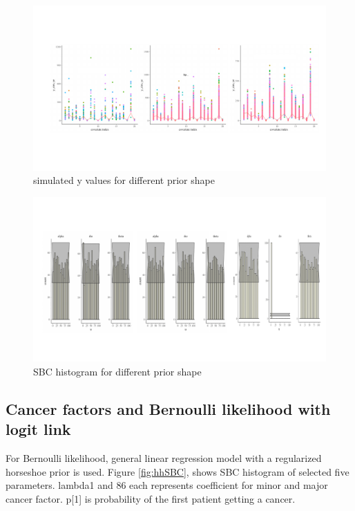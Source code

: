 \documentclass{article}
\begin{document}
  \begin{figure}[!htb]
  \centering
    \includegraphics[width=\textwidth]{writeup/figures/dm_y_sim_priorshape.pdf}
    \caption{simulated y values for different prior shape}
    \label{fig:ysimPriorShape}
  \end{figure}
  
  \begin{figure}[!htb]
  \centering
    \includegraphics[width=\textwidth]{writeup/figures/diseasemap_sbc_priorshape.pdf}
    \caption{SBC histogram for different prior shape}
    \label{fig:SBCPriorShape}
  \end{figure}


 \subsection{Cancer factors and Bernoulli likelihood with logit link}
  For Bernoulli likelihood, general linear regression model with a regularized horseshoe prior is used. Figure \ref{fig:hhSBC}, shows SBC histogram of selected five parameters. lambda1 and 86 each represents coefficient for minor and major cancer factor. p[1] is probability of the first patient getting a cancer. 
  
\end{document}
